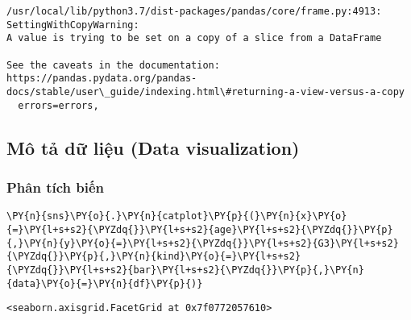     \begin{Verbatim}[commandchars=\\\{\}]
/usr/local/lib/python3.7/dist-packages/pandas/core/frame.py:4913:
SettingWithCopyWarning:
A value is trying to be set on a copy of a slice from a DataFrame

See the caveats in the documentation: https://pandas.pydata.org/pandas-
docs/stable/user\_guide/indexing.html\#returning-a-view-versus-a-copy
  errors=errors,
    \end{Verbatim}

    \hypertarget{muxf4-tux1ea3-dux1eef-liux1ec7u-data-visualization}{%
\subsection{Mô tả dữ liệu (Data
visualization)}\label{muxf4-tux1ea3-dux1eef-liux1ec7u-data-visualization}}

    \hypertarget{phuxe2n-tuxedch-biux1ebfn}{%
\subsubsection{Phân tích biến}\label{phuxe2n-tuxedch-biux1ebfn}}

    \begin{tcolorbox}[breakable, size=fbox, boxrule=1pt, pad at break*=1mm,colback=cellbackground, colframe=cellborder]
\begin{Verbatim}[commandchars=\\\{\}]
\PY{n}{sns}\PY{o}{.}\PY{n}{catplot}\PY{p}{(}\PY{n}{x}\PY{o}{=}\PY{l+s+s2}{\PYZdq{}}\PY{l+s+s2}{age}\PY{l+s+s2}{\PYZdq{}}\PY{p}{,}\PY{n}{y}\PY{o}{=}\PY{l+s+s2}{\PYZdq{}}\PY{l+s+s2}{G3}\PY{l+s+s2}{\PYZdq{}}\PY{p}{,}\PY{n}{kind}\PY{o}{=}\PY{l+s+s2}{\PYZdq{}}\PY{l+s+s2}{bar}\PY{l+s+s2}{\PYZdq{}}\PY{p}{,}\PY{n}{data}\PY{o}{=}\PY{n}{df}\PY{p}{)}
\end{Verbatim}
\end{tcolorbox}

            \begin{tcolorbox}[breakable, size=fbox, boxrule=.5pt, pad at break*=1mm, opacityfill=0]
\begin{Verbatim}[commandchars=\\\{\}]
<seaborn.axisgrid.FacetGrid at 0x7f0772057610>
\end{Verbatim}
\end{tcolorbox}
        
    \begin{center}
    \end{center}
    { \hspace*{\fill} \\}
    
